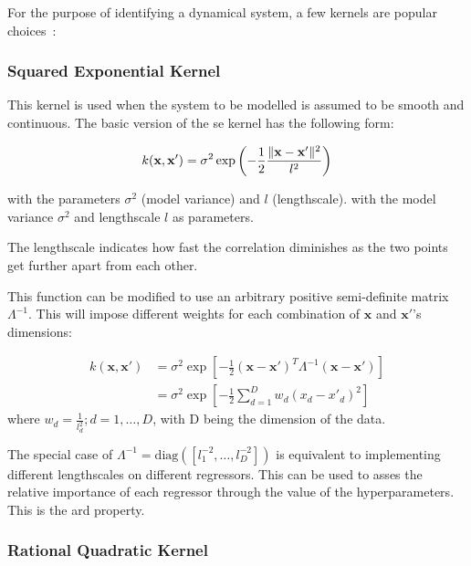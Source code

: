 For the purpose of identifying a dynamical system, a few kernels are popular
choices~\cite{kocijanModellingControlDynamic2016}: 


\subsubsection*{Squared Exponential Kernel}

This kernel is used when the system to be modelled is assumed to be smooth and
continuous. The basic version of the \acrshort{se} kernel has the following form:

\begin{equation}
    k(\mathbf{x}, \mathbf{x'}) = \sigma^2 \exp{\left(- \frac{1}{2}\frac{\lVert\mathbf{x} -
    \mathbf{x'}\rVert^2}{l^2}\right)}
\end{equation}

with the parameters $\sigma^2$ (model variance) and $l$ (lengthscale).
with the model variance $\sigma^2$ and lengthscale $l$ as parameters.

The lengthscale indicates how fast the correlation diminishes as the two points
get further apart from each other.

This function can be modified to use an arbitrary positive semi-definite matrix
$\Lambda^{-1}$.
This will impose different weights for each combination of $\mathbf{x}$ and
$\mathbf{x'}$'s dimensions:

\begin{equation}
    \begin{aligned}
        k(\mathbf{x}, \mathbf{x'})
        &= \sigma^2\exp{\left[-\frac{1}{2} (\mathbf{x} - \mathbf{x'})^T \Lambda^{-1}
        (\mathbf{x} - \mathbf{x'})\right]} \\
        &= \sigma^2 \exp{\left[-\frac{1}{2}\sum_{d=1}^D w_d(x_d - x'_d)^2\right]}
    \end{aligned}
\end{equation}
where $w_d = \frac{1}{l_d^2}; d = 1 ,\dots, D$, with D being the dimension of the
data.

The special case of $\Lambda^{-1} = \text{diag}{\left([l_1^{-2},\dots,l_D^{-2}]\right)}$
is equivalent to implementing different lengthscales on different regressors.
This can be used to asses the relative importance of each regressor through the
value of the hyperparameters. This is the \acrfull{ard} property.


\subsubsection*{Rational Quadratic Kernel}

